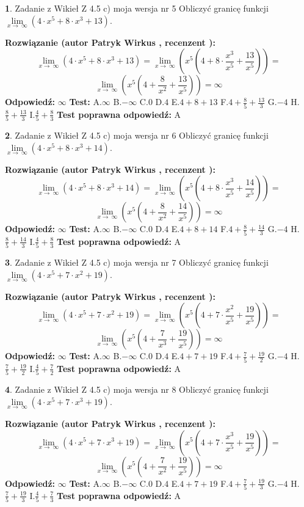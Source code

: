 \documentclass[12pt, a4paper]{article}
\theoremstyle{definition} %
\newtheorem{zad}{}
\newcommand{\zadStart}[1]{\begin{zad}#1\newline}
\newcommand{\zadStop}{\end{zad}}
\newcommand{\rozwStart}[2]{\noindent \textbf{Rozwiązanie (autor #1 , recenzent #2): }\newline}
\newcommand{\rozwStop}{\newline}
\newcommand{\odpStart}{\noindent \textbf{Odpowiedź:}\newline}
\newcommand{\odpStop}{\newline}
\newcommand{\testStart}{\noindent \textbf{Test:}\newline}
\newcommand{\testStop}{\newline}
\newcommand{\kluczStart}{\noindent \textbf{Test poprawna odpowiedź:}\newline}
\newcommand{\kluczStop}{\newline}
\begin{document}
\zadStart{Zadanie z Wikieł Z 4.5 c) moja wersja nr 5}
Obliczyć granicę funkcji  $\lim\limits_{x\to\ \infty}(4 \cdot x^{5}+8 \cdot x^{3}+13)$.
\zadStop
\rozwStart{Patryk Wirkus}{}
$$\lim\limits_{x\to\ \infty}(4 \cdot x^{5}+8 \cdot x^{3}+13) = \lim\limits_{x\to\ \infty}(x^{5}(4 +8 \cdot \frac{x^{3}}{x^{5}}+\frac{13}{x^{5}})) =$$ $$\lim\limits_{x\to\ \infty}(x^{5}(4 +\frac{8}{x^{2}}+\frac{13}{x^{5}})) =\infty$$
\rozwStop
\odpStart
$\infty$
\odpStop
\testStart
A.$\infty$ B.$-\infty$ C.$0$ D.$4$ E.$4 + 8 + 13$
F.$4+\frac{8}{5}+\frac{13}{3}$ G.$-4$
H.$\frac{8}{5}+\frac{13}{3}$
I.$\frac{4}{5}+\frac{8}{3}$
\testStop
\kluczStart
A
\kluczStop



\zadStart{Zadanie z Wikieł Z 4.5 c) moja wersja nr 6}
Obliczyć granicę funkcji  $\lim\limits_{x\to\ \infty}(4 \cdot x^{5}+8 \cdot x^{3}+14)$.
\zadStop
\rozwStart{Patryk Wirkus}{}
$$\lim\limits_{x\to\ \infty}(4 \cdot x^{5}+8 \cdot x^{3}+14) = \lim\limits_{x\to\ \infty}(x^{5}(4 +8 \cdot \frac{x^{3}}{x^{5}}+\frac{14}{x^{5}})) =$$ $$\lim\limits_{x\to\ \infty}(x^{5}(4 +\frac{8}{x^{2}}+\frac{14}{x^{5}})) =\infty$$
\rozwStop
\odpStart
$\infty$
\odpStop
\testStart
A.$\infty$ B.$-\infty$ C.$0$ D.$4$ E.$4 + 8 + 14$
F.$4+\frac{8}{5}+\frac{14}{3}$ G.$-4$
H.$\frac{8}{5}+\frac{14}{3}$
I.$\frac{4}{5}+\frac{8}{3}$
\testStop
\kluczStart
A
\kluczStop



\zadStart{Zadanie z Wikieł Z 4.5 c) moja wersja nr 7}
Obliczyć granicę funkcji  $\lim\limits_{x\to\ \infty}(4 \cdot x^{5}+7 \cdot x^{2}+19)$.
\zadStop
\rozwStart{Patryk Wirkus}{}
$$\lim\limits_{x\to\ \infty}(4 \cdot x^{5}+7 \cdot x^{2}+19) = \lim\limits_{x\to\ \infty}(x^{5}(4 +7 \cdot \frac{x^{2}}{x^{5}}+\frac{19}{x^{5}})) =$$ $$\lim\limits_{x\to\ \infty}(x^{5}(4 +\frac{7}{x^{3}}+\frac{19}{x^{5}})) =\infty$$
\rozwStop
\odpStart
$\infty$
\odpStop
\testStart
A.$\infty$ B.$-\infty$ C.$0$ D.$4$ E.$4 + 7 + 19$
F.$4+\frac{7}{5}+\frac{19}{2}$ G.$-4$
H.$\frac{7}{5}+\frac{19}{2}$
I.$\frac{4}{5}+\frac{7}{2}$
\testStop
\kluczStart
A
\kluczStop



\zadStart{Zadanie z Wikieł Z 4.5 c) moja wersja nr 8}
Obliczyć granicę funkcji  $\lim\limits_{x\to\ \infty}(4 \cdot x^{5}+7 \cdot x^{3}+19)$.
\zadStop
\rozwStart{Patryk Wirkus}{}
$$\lim\limits_{x\to\ \infty}(4 \cdot x^{5}+7 \cdot x^{3}+19) = \lim\limits_{x\to\ \infty}(x^{5}(4 +7 \cdot \frac{x^{3}}{x^{5}}+\frac{19}{x^{5}})) =$$ $$\lim\limits_{x\to\ \infty}(x^{5}(4 +\frac{7}{x^{2}}+\frac{19}{x^{5}})) =\infty$$
\rozwStop
\odpStart
$\infty$
\odpStop
\testStart
A.$\infty$ B.$-\infty$ C.$0$ D.$4$ E.$4 + 7 + 19$
F.$4+\frac{7}{5}+\frac{19}{3}$ G.$-4$
H.$\frac{7}{5}+\frac{19}{3}$
I.$\frac{4}{5}+\frac{7}{3}$
\testStop
\kluczStart
A
\kluczStop
\end{document}
